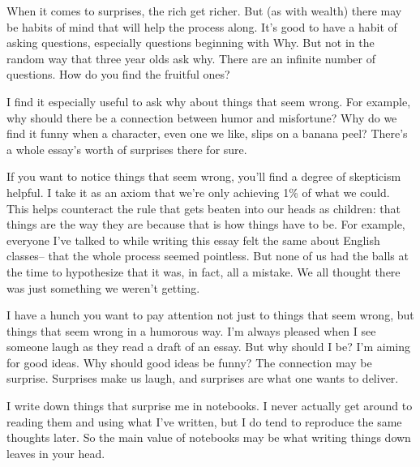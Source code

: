 When it comes to
                  surprises, the rich get richer. But (as with wealth) there may
                  be habits of mind that will help the process along. It's good
                  to have a habit of asking questions, especially questions
                  beginning with Why. But not in the random way that three year
                  olds ask why. There are an infinite number of questions. How
                  do you find the fruitful ones?

I find it especially
                  useful to ask why about things that seem wrong. For example,
                  why should there be a connection between humor and misfortune?
                  Why do we find it funny when a character, even one we like,
                  slips on a banana peel? There's a whole essay's worth of
                  surprises there for sure.

If you want to notice
                  things that seem wrong, you'll find a degree of skepticism
                  helpful. I take it as an axiom that we're only achieving 1\% of
                  what we could. This helps counteract the rule that gets beaten
                  into our heads as children: that things are the way they are
                  because that is how things have to be. For example, everyone
                  I've talked to while writing this essay felt the same about
                  English classes-- that the whole process seemed pointless. But
                  none of us had the balls at the time to hypothesize that it
                  was, in fact, all a mistake. We all thought there was just
                  something we weren't getting.

I have a hunch you
                  want to pay attention not just to things that seem wrong, but
                  things that seem wrong in a humorous way. I'm always pleased
                  when I see someone laugh as they read a draft of an essay. But
                  why should I be? I'm aiming for good ideas. Why should good
                  ideas be funny? The connection may be surprise. Surprises make
                  us laugh, and surprises are what one wants to deliver.

I
                  write down things that surprise me in notebooks. I never
                  actually get around to reading them and using what I've
                  written, but I do tend to reproduce the same thoughts later.
                  So the main value of notebooks may be what writing things down
                  leaves in your head.

